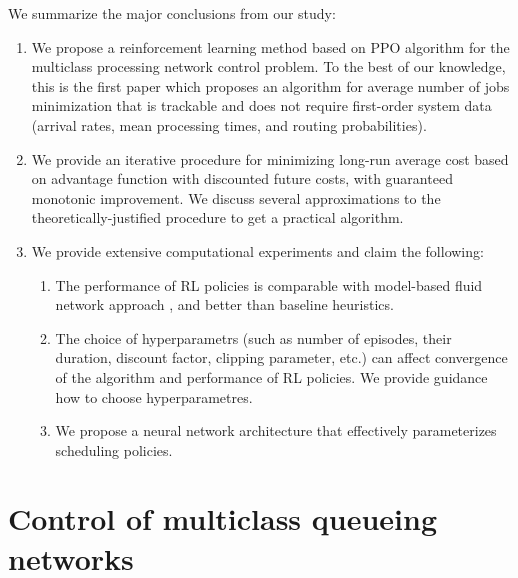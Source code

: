 \documentclass[11pt]{article}
\theoremstyle{definition}
\numberwithin{equation}{section}
\begin{document}
We summarize the major conclusions from our study:
\begin{enumerate}
  \item We propose a reinforcement learning method based on  PPO \cite{Schulman2017} algorithm for the multiclass processing network control problem. To the best of our knowledge, this is the first paper which proposes an algorithm for average number of jobs minimization that is trackable and does not require first-order system data (arrival rates, mean processing
times, and routing probabilities).

\item We provide an iterative procedure for minimizing long-run average cost based on advantage function with discounted future costs, with guaranteed monotonic improvement. We  discuss several approximations to the
theoretically-justified procedure to get a practical algorithm.



  \item We provide extensive computational experiments and claim the following:
   \begin{enumerate}
     \item The performance of RL policies is comparable with model-based fluid network approach  \cite{Bertsimas2015}, \cite{Bertsimas2017} and better than baseline heuristics.
     \item The choice of hyperparametrs (such as number of episodes, their duration, discount factor, clipping parameter, etc.) can   affect convergence of the algorithm and performance of RL policies. We provide guidance how to choose  hyperparametres.
         \item We propose  a neural network architecture that effectively parameterizes scheduling policies.
   \end{enumerate}



\end{enumerate}


\section{Control of multiclass queueing networks}\label{sec:MQN}
\end{document}
